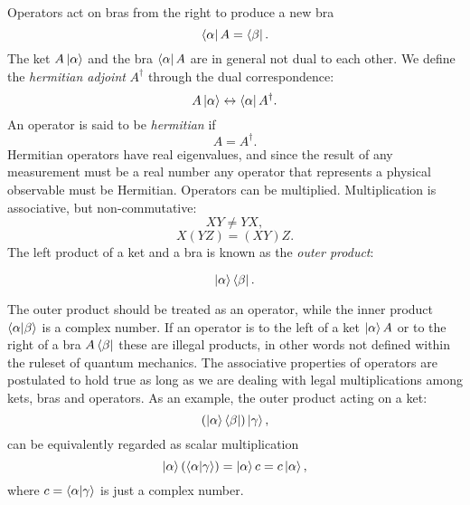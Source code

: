 \par
Operators act on bras from the right to produce a new bra
\begin{equation}
 \bra{\alpha} A = \bra{\beta} .
\end{equation}
The ket $A \ket{\alpha}$ and the bra $\bra{\alpha} A$ are in general
not dual to each other. We define the \textit{hermitian adjoint} $A^{\dagger}$
through the dual correspondence:
\begin{equation}
 A \ket{\alpha} \leftrightarrow \bra{\alpha} A^{\dagger} .
\end{equation}
An operator is said to be \textit{hermitian} if
\begin{equation}
 A = A^{\dagger} .
\end{equation}
Hermitian operators have real eigenvalues, and since the result
of any measurement must be a real number any operator that
represents a physical observable must be Hermitian.
\newline
Operators can be multiplied. Multiplication is associative, but non-commutative:
\begin{equation}
 XY \neq YX ,
\end{equation}
\begin{equation}
 X(YZ) = (XY)Z .
\end{equation}
The left product of a ket and a bra is known as the \textit{outer product}:

\begin{equation}
 \ket{\alpha} \bra{\beta} .
\end{equation}

The outer product should be treated as an operator, while the inner product
$\braket{\alpha | \beta}$ is a complex number.
If an operator is to the left of a ket $\ket{\alpha} A$ or to the right
of a bra $A \bra{\beta}$ these are illegal products, in other words
not defined within the ruleset of quantum mechanics.
The associative properties of operators are postulated to hold true
as long as we are dealing with legal multiplications among kets, bras
and operators. As an example, the outer product acting on a ket:
\begin{equation}
 (\ket{\alpha} \bra{\beta}) \ket{\gamma} ,
\end{equation}
can be equivalently regarded as scalar multiplication
\begin{equation}
 \ket{\alpha} (\braket{\alpha | \gamma})
    = \ket{\alpha} c = c \ket{\alpha} ,
\end{equation}
where $c = \braket{\alpha | \gamma}$ is just a complex number.

